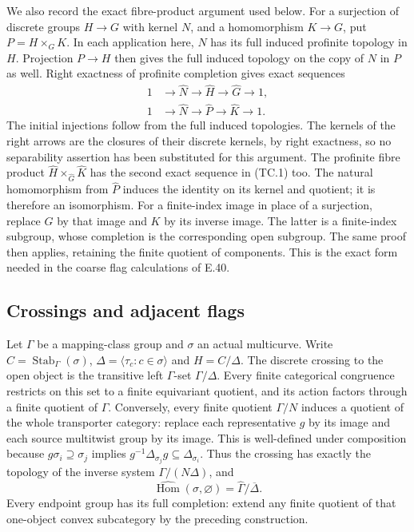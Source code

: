 We also record the exact fibre-product argument used below.  For a
surjection of discrete groups $H\to G$ with kernel $N$, and a
homomorphism $K\to G$, put $P=H\times_G K$.
In each application here, $N$ has its full induced profinite topology
in $H$.  Projection $P\to H$ then gives the full induced topology
on the copy of $N$ in $P$ as well.  Right exactness of profinite
completion gives exact sequences
\[
\begin{split}
1&\longrightarrow\widehat N\longrightarrow\widehat H
                      \longrightarrow\widehat G\longrightarrow1,\\
1&\longrightarrow\widehat N\longrightarrow\widehat P
                      \longrightarrow\widehat K\longrightarrow1.
\end{split}                                                     \tag{TC.1}
\]
The initial injections follow from the full induced topologies.
The kernels of the right arrows are the closures of their discrete
kernels, by right exactness, so no separability assertion has been
substituted for this argument.  The profinite fibre product
$\widehat H\times_{\widehat G}\widehat K$ has the second exact
sequence in (TC.1) too.  The natural homomorphism from $\widehat P$
induces the identity on its kernel and quotient; it is therefore an
isomorphism.  For a finite-index image in place of a surjection, replace
$G$ by that image and $K$ by its inverse image.  The latter is a
finite-index subgroup, whose completion is the corresponding open
subgroup.  The same proof then applies, retaining the finite quotient
of components.  This is the exact form needed in the coarse flag
calculations of E.40.

\subsection{Crossings and adjacent flags}

Let $\Gamma$ be a mapping-class group and $\sigma$ an actual
multicurve.  Write $C=\operatorname{Stab}_\Gamma(\sigma)$,
$\Delta=\langle\tau_c:c\in\sigma\rangle$ and $H=C/\Delta$.
The discrete crossing to the open object is the transitive left
$\Gamma$-set $\Gamma/\Delta$.  Every finite categorical congruence
restricts on this set to a finite equivariant quotient, and its action
factors through a finite quotient of $\Gamma$.  Conversely, every
finite quotient $\Gamma/N$ induces a quotient of the whole
transporter category: replace each representative $g$ by its image
and each source multitwist group by its image.  This is well-defined
under composition because
$g\sigma_i\supseteq\sigma_j$ implies
$g^{-1}\Delta_{\sigma_j}g\subseteq\Delta_{\sigma_i}$.
Thus the crossing has exactly the topology of the inverse system
$\Gamma/(N\Delta)$, and
\[
       \widehat{\operatorname{Hom}}(\sigma,\varnothing)
                  =\widehat\Gamma/\overline\Delta.         \tag{TC.2}
\]
Every endpoint group has its full completion: extend any finite quotient
of that one-object convex subcategory by the preceding construction.

